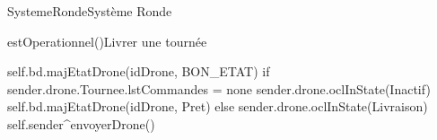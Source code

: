 \begin{OM}{SystemeRonde}{Système Ronde}
    \begin{OMOperation}{estOperationnel()}{Livrer une tournée}{}
        \begin{OMMessages}
        \end{OMMessages}
        \OMNoPre
        \begin{OMPost}
self.bd.majEtatDrone(idDrone, BON_ETAT)
if sender.drone.Tournee.lstCommandes = none
    sender.drone.oclInState(Inactif)
    self.bd.majEtatDrone(idDrone, Pret)
else
    sender.drone.oclInState(Livraison)
    self.sender^envoyerDrone()
        \end{OMPost}
    \end{OMOperation}
\end{OM}
